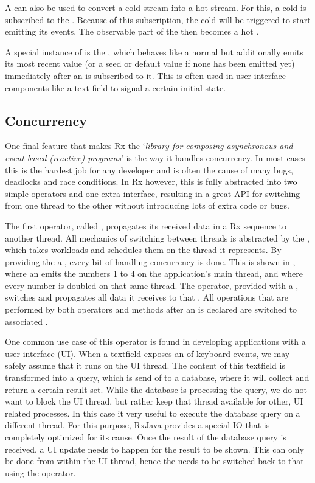 A \subj can also be used to convert a cold stream into a hot stream. For this, a cold \obs is subscribed to the \subj. Because of this subscription, the cold \obs will be triggered to start emitting its events. The observable part of the \subj then becomes a hot \obs.

A special instance of \subj is the \bsubj, which behaves like a normal \subj but additionally emits its most recent value (or a seed or default value if none has been emitted yet) immediately after an \obv is subscribed to it. This is often used in user interface components like a text field to signal a certain initial state.

\subsection{Concurrency}
One final feature that makes Rx the `\textit{library for composing asynchronous and event based (reactive) programs}' is the way it handles concurrency. In most cases this is the hardest job for any developer and is often the cause of many bugs, deadlocks and race conditions. In Rx however, this is fully abstracted into two simple operators and one extra interface, resulting in a great API for switching from one thread to the other without introducing lots of extra code or bugs.

The first operator, called , propagates its received data in a Rx sequence to another thread. All mechanics of switching between threads is abstracted by the \sch, which takes workloads and schedules them on the thread it represents. By providing the  a \sch, every bit of handling concurrency is done. This is shown in , where an \obs emits the numbers 1 to 4 on the application's main thread, and where every number is doubled on that same thread. The  operator, provided with a , switches and propagates all data it receives to that \sch. All operations that are performed by both operators and  methods after an  is declared are switched to associated \sch.

One common use case of this operator is found in developing applications with a user interface (UI). When a textfield exposes an \obs of keyboard events, we may safely assume that it runs on the UI thread. The content of this textfield is transformed into a query, which is send of to a database, where it will collect and return a certain result set. While the database is processing the query, we do not want to block the UI thread, but rather keep that thread available for other, UI related processes. In this case it very useful to execute the database query on a different thread. For this purpose, RxJava provides a special IO \sch that is completely optimized for its cause. Once the result of the database query is received, a UI update needs to happen for the result to be shown. This can only be done from within the UI thread, hence the \obs needs to be switched back to that \sch using the  operator.


